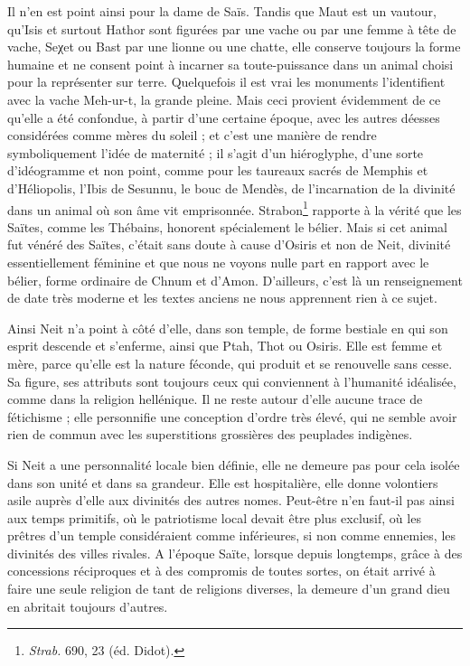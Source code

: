 \documentclass[a4paper, 11pt, oneside]{article}
\begin{document}
Il n'en est point ainsi pour la dame de Saïs. Tandis que Maut est un vautour, qu'Isis et surtout Hathor sont figurées par une vache ou par une femme à tête de vache, Seχet ou Bast par une lionne ou une chatte, elle conserve toujours la forme humaine et ne consent point à incarner sa toute-puissance dans un animal choisi pour la représenter sur terre. Quelquefois il est vrai les monuments l'identifient avec la vache Meh-ur-t, la grande pleine. Mais ceci provient évidemment de ce qu’elle a été confondue, à partir d'une certaine époque, avec les autres déesses considérées comme mères du soleil ; et c'est une manière de rendre symboliquement l'idée de maternité ; il s'agit d'un hiéroglyphe, d'une sorte d'idéogramme et non point, comme pour les taureaux sacrés de Memphis et d'Héliopolis, l'Ibis de Sesunnu, le bouc de Mendès, de l'incarnation de la divinité dans un animal où son âme vit emprisonnée. Strabon\footnote{\emph{Strab.} 690, 23 (éd. Didot).} rapporte à la vérité que les Saïtes, comme les Thébains, honorent spécialement le bélier. Mais si cet animal fut vénéré des Saïtes, c'était sans doute à cause d'Osiris et non de Neit, divinité essentiellement féminine et que nous ne voyons nulle part en rapport avec le bélier, forme ordinaire de Chnum et d'Amon. D'ailleurs, c'est là un renseignement de date très moderne et les textes anciens ne nous apprennent rien à ce sujet.

Ainsi Neit n'a point à côté d'elle, dans son temple, de forme bestiale en qui son esprit descende et s'enferme, ainsi que Ptah, Thot ou Osiris. Elle est femme et mère, parce qu’elle est la nature féconde, qui produit et se renouvelle sans cesse. Sa figure, ses attributs sont toujours ceux qui conviennent à l'humanité idéalisée, comme dans la religion hellénique. Il ne reste autour d'elle aucune trace de fétichisme ; elle personnifie une conception d'ordre très élevé, qui ne semble avoir rien de commun avec les superstitions grossières des peuplades indigènes.

Si Neit a une personnalité locale bien définie, elle ne demeure pas pour cela isolée dans son unité et dans sa grandeur. Elle est hospitalière, elle donne volontiers asile auprès d'elle aux divinités des autres nomes. Peut-être n'en faut-il pas ainsi aux temps primitifs, où le patriotisme local devait être plus exclusif, où les prêtres d'un temple considéraient comme inférieures, si non comme ennemies, les divinités des villes rivales. A l'époque Saïte, lorsque depuis longtemps, grâce à des concessions réciproques et à des compromis de toutes sortes, on était arrivé à faire une seule religion de tant de religions diverses, la demeure d'un grand dieu en abritait toujours d'autres.
\end{document}

